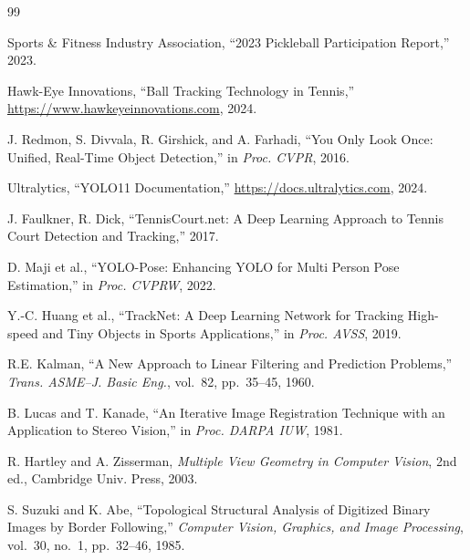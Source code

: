 \documentclass[12pt,a4paper]{article}
\begin{document}
\begin{thebibliography}{99}

 Sports \& Fitness Industry Association, ``2023 Pickleball Participation Report,'' 2023.

 Hawk-Eye Innovations, ``Ball Tracking Technology in Tennis,'' \url{https://www.hawkeyeinnovations.com}, 2024.

 J. Redmon, S. Divvala, R. Girshick, and A. Farhadi, ``You Only Look Once: Unified, Real-Time Object Detection,'' in \textit{Proc. CVPR}, 2016.

 Ultralytics, ``YOLO11 Documentation,'' \url{https://docs.ultralytics.com}, 2024.

 J. Faulkner, R. Dick, ``TennisCourt.net: A Deep Learning Approach to Tennis Court Detection and Tracking,'' 2017.

 D. Maji et al., ``YOLO-Pose: Enhancing YOLO for Multi Person Pose Estimation,'' in \textit{Proc. CVPRW}, 2022.

 Y.-C. Huang et al., ``TrackNet: A Deep Learning Network for Tracking High-speed and Tiny Objects in Sports Applications,'' in \textit{Proc. AVSS}, 2019.

 R.E. Kalman, ``A New Approach to Linear Filtering and Prediction Problems,'' \textit{Trans. ASME--J. Basic Eng.}, vol.~82, pp.~35--45, 1960.

 B. Lucas and T. Kanade, ``An Iterative Image Registration Technique with an Application to Stereo Vision,'' in \textit{Proc. DARPA IUW}, 1981.

 R. Hartley and A. Zisserman, \textit{Multiple View Geometry in Computer Vision}, 2nd ed., Cambridge Univ. Press, 2003.

 S. Suzuki and K. Abe, ``Topological Structural Analysis of Digitized Binary Images by Border Following,'' \textit{Computer Vision, Graphics, and Image Processing}, vol.~30, no.~1, pp.~32--46, 1985.

\end{thebibliography}
\end{document}
